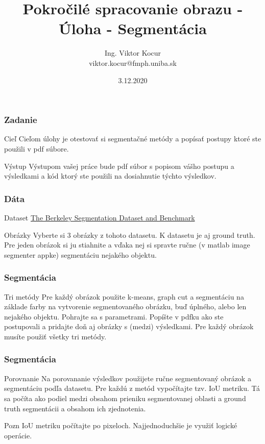 \documentclass{beamer}
\title[2. Úloha]{Pokročilé spracovanie obrazu - Úloha - Segmentácia}
\author[Kocur]{Ing. Viktor Kocur \\{\small viktor.kocur@fmph.uniba.sk}}
\institute{DAI FMFI UK}
\date{3.12.2020}
\begin{document}

\begin{frame}
  \titlepage
\end{frame}

\begin{frame}
\frametitle{Zadanie}
\begin{block}{Cieľ}
Cieľom úlohy je otestovať si segmentačné metódy a popísať postupy ktoré ste použili v pdf súbore.
\end{block}

\begin{block}{Výstup}
Výstupom vašej práce bude pdf súbor s popisom vášho postupu a výsledkami a kód ktorý ste použili na dosiahnutie týchto výsledkov.
\end{block}
\end{frame}


\begin{frame}
\frametitle{Dáta}
\begin{block}{Dataset}
\href{https://www2.eecs.berkeley.edu/Research/Projects/CS/vision/bsds/BSDS300/html/dataset/images.html}{The Berkeley Segmentation Dataset and Benchmark}
\end{block}

\begin{block}{Obrázky}
Vyberte si 3 obrázky z tohoto datasetu. K datasetu je aj ground truth. Pre jeden obrázok si ju stiahnite a vďaka nej si spravte ručne (v matlab image segmenter appke) segmentáciu nejakého objektu.
\end{block}
\end{frame}

\begin{frame}
\frametitle{Segmentácia}

\begin{block}{Tri metódy}
Pre každý obrázok použite k-means, graph cut a segmentáciu na základe farby na vytvorenie segmentovaného obrázku, buď úplného, alebo len nejakého objektu.  Pohrajte sa s parametrami. Popíšte v pdfku ako ste postupovali a pridajte doň aj obrázky s (medzi) výsledkami. Pre každý obrázok musíte použiť všetky tri metódy.
\end{block}

\end{frame}

\begin{frame}
\frametitle{Segmentácia}

\begin{block}{Porovnanie}
Na porovananie výsledkov použijete ručne segmentovaný obrázok a segmentáciu podľa datasetu. Pre každú z metód vypočítajte tzv. IoU metriku. Tá sa počíta ako podiel medzi obsahom prieniku segmentovanej oblasti a ground truth segmentácii a obsahom ich zjednotenia.
\end{block}

\begin{alertblock}{Pozn}
IoU metriku počítajte po pixeloch. Najjednoduchšie je využiť logické operácie.
\end{alertblock}
\end{frame}
\end{document}
